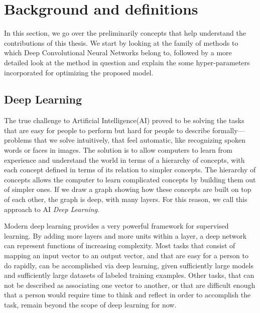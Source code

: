 \chapter{Background and definitions}
\label{sec:Background}
In this section, we go over the preliminarily concepts that help understand the contributions of this thesis. We start by looking at the family of methods to which Deep Convolutional Neural Networks belong to, followed by a more detailed look at the method in question and explain the some hyper-parameters incorporated for optimizing the proposed model. 

\section{Deep Learning}

The true challenge to Artificial Intelligence(AI) proved to be solving the tasks that are easy for people to perform but hard for people to describe formally—problems that we solve intuitively, that feel automatic, like recognizing spoken words or faces in images. The solution is to allow computers to learn from experience and understand the world in terms of a hierarchy of concepts, with each concept defined in terms of its relation to simpler concepts. The hierarchy of concepts allows the computer to learn complicated concepts by building them out of simpler ones. If we draw a graph showing how these concepts are built on top of each other, the graph is deep, with many layers. For this reason, we call this approach to AI \textit{Deep Learning}\cite{Goodfellow-et-al-2016-Book}.

Modern deep learning provides a very powerful framework for supervised learning. By adding more layers and more units within a layer, a deep network can represent functions of increasing complexity. Most tasks that consist of mapping an input vector to an output vector, and that are easy for a person to do rapidly, can be accomplished via deep learning, given sufficiently large models and sufficiently large datasets of labeled training examples. Other tasks, that can not be described as associating one vector to another, or that are difficult enough that a person would require time to think and reflect in order to accomplish the task, remain beyond the scope of deep learning for now\cite{Goodfellow-et-al-2016-Book}.

